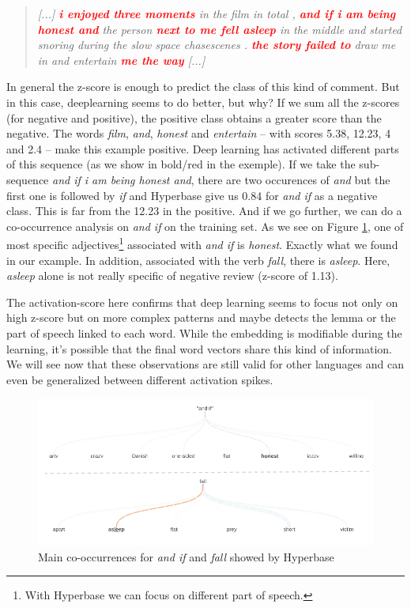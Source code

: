 \begin{quote}
\textit{[...] \textcolor{red}{\textbf{i enjoyed three moments}} in the film in total , \textcolor{red}{\textbf{and if i am being honest and}} the person \textcolor{red}{\textbf{next to me fell asleep}} in the middle and started snoring during the slow space chasescenes . \textcolor{red}{\textbf{the story failed to}} draw me in and entertain \textcolor{red}{\textbf{me the way}} [...]} 
\end{quote}%

In general the z-score is enough to predict the class of this kind of comment. But in this case, deeplearning seems to do better, but why? If we sum all the z-scores (for negative and positive), the positive class obtains a greater score than the negative. The words \textit{film}, \textit{and}, \textit{honest} and \textit{entertain} -- with scores 5.38, 12.23, 4 and 2.4 -- make this example positive. Deep learning has activated different parts of this sequence (as we show in bold/red in the exemple). If we take the sub-sequence \textit{and if i am being honest and}, there are two occurences of \textit{and} but the first one is followed by \textit{if} and Hyperbase give us 0.84 for \textit{and if} as a negative class. This is far from the 12.23 in the positive. And if we go further, we can do a co-occurrence analysis on \textit{and if} on the training set. As we see on Figure \ref{data_english}, one of most specific adjectives\footnote{With Hyperbase we can focus on different part of speech.} associated with \textit{and if} is \textit{honest}. Exactly what we found in our example. In addition, associated with the verb \textit{fall}, there is \textit{asleep}. Here, \textit{asleep} alone is not really specific of negative review (z-score of 1.13). 

The activation-score here confirms that deep learning seems to focus not only on high z-score but on more complex patterns and maybe detects the lemma or the part of speech linked to each word. While the embedding is modifiable during the learning, it's possible that the final word vectors share this kind of information. We will see now that these observations are still valid for other languages and can even be generalized between different activation spikes.

\begin{figure}[h]
\begin{center}
\includegraphics[width=16cm]{img/cooc_english2.png}
\caption{Main co-occurrences for \textit{and if} and \textit{fall} showed by Hyperbase}
\label{data_english}
\end{center}
\end{figure}



